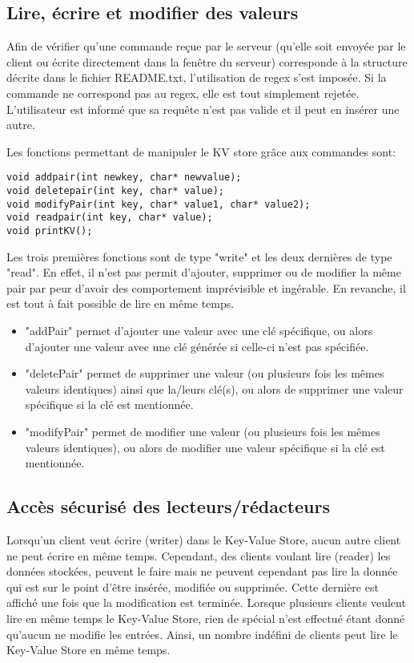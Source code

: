 \documentclass[11pt,a4paper]{article}
\begin{document}
\subsection{Lire, écrire et modifier des valeurs}
Afin de vérifier qu'une commande reçue par le serveur (qu'elle soit envoyée par le client ou écrite directement dans la fenêtre du serveur) corresponde à la structure décrite dans le fichier README.txt, l'utilisation de regex s'est imposée. Si la commande ne correspond pas au regex, elle est tout simplement rejetée. L'utilisateur est informé que sa requête n'est pas valide et il peut en insérer une autre.

Les fonctions permettant de manipuler le KV store grâce aux commandes sont:
\begin{lstlisting}
void addpair(int newkey, char* newvalue);
void deletepair(int key, char* value);
void modifyPair(int key, char* value1, char* value2);
void readpair(int key, char* value);
void printKV();
\end{lstlisting}
Les trois premières fonctions sont de type "write" et les deux dernières de type "read". En effet, il n'est pas permit d'ajouter, supprimer ou de modifier la même pair par peur d'avoir des comportement imprévisible et ingérable. En revanche, il est tout à fait possible de lire en même temps.\\

\begin{itemize}
\item "addPair" permet d'ajouter une valeur avec une clé spécifique, ou alors d'ajouter une valeur avec une clé générée si celle-ci n'est pas spécifiée.
\item "deletePair" permet de supprimer une valeur (ou plusieurs fois les mêmes valeurs identiques) ainsi que la/leurs clé(s), ou alors de supprimer une valeur spécifique si la clé est mentionnée.
\item "modifyPair" permet de modifier une valeur (ou plusieurs fois les mêmes valeurs identiques), ou alors de modifier une valeur spécifique si la clé est mentionnée.
\end{itemize}


\subsection{Accès sécurisé des lecteurs/rédacteurs}
Lorsqu'un client veut écrire (writer) dans le Key-Value Store, aucun autre client ne peut écrire en même temps. Cependant, des clients voulant lire (reader) les données stockées, peuvent le faire mais ne peuvent cependant pas lire la donnée qui est sur le point d'être insérée, modifiée ou supprimée. Cette dernière est affiché une fois que la modification est terminée. Lorsque plusieurs clients veulent lire en même temps le Key-Value Store, rien de spécial n'est effectué étant donné qu'aucun ne modifie les entrées. Ainsi, un nombre indéfini de clients peut lire le Key-Value Store en même temps.
\end{document}
